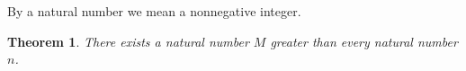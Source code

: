 \documentclass{article}
\newtheorem{theorem}{Theorem}
\begin{document}
By a natural number we mean a nonnegative integer.
\begin{theorem}\label{thm:X03}
There exists a natural number $M$ greater than every natural number $n$.
\end{theorem}
\end{document}
